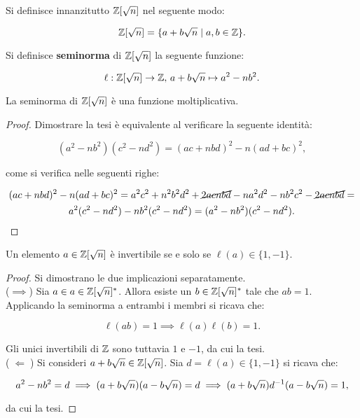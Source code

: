 \documentclass[11pt]{scrbook}
\begin{document}
Si definisce innanzitutto $\mathbb Z[\sqrt{n}]$ nel seguente modo:

\[ \mathbb Z[\sqrt{n}] = \{ a + b\sqrt{n} \mid a, b \in \mathbb Z \}. \]

\begin{definition}
    Si definisce \textbf{seminorma} di $\mathbb Z[\sqrt{n}]$ la seguente
    funzione:
    
    \[ \ell : \mathbb Z[\sqrt{n}] \to \mathbb Z, \, a + b\sqrt{n} \mapsto a^2 - n b^2. \]
\end{definition}

\begin{proposition}
    La seminorma di $\mathbb Z[\sqrt{n}]$ è una funzione moltiplicativa.
\end{proposition}

\begin{proof}
    Dimostrare la tesi è equivalente al verificare la seguente identità:
    
    \[ (a^2-nb^2)(c^2-nd^2)=(ac+nbd)^2-n(ad+bc)^2, \]
    
    \vskip 0.1in
    
    come si verifica nelle seguenti righe:
    
    \begin{multline*}
        (ac+nbd)^2-n(ad+bc)^2 = a^2c^2+n^2b^2d^2+\cancel{2acnbd}-na^2d^2-nb^2c^2-\cancel{2acnbd} = \\
        a^2(c^2-nd^2) -nb^2(c^2-nd^2) = (a^2-nb^2)(c^2-nd^2).
    \end{multline*}
\end{proof}

\begin{theorem}
    \label{th:invertibili_z_sqrtn}
    Un elemento $a \in \mathbb Z[\sqrt{n}]$ è invertibile se e solo se
    $\ell(a) \in \{1, -1\}$.
\end{theorem}

\begin{proof}
    Si dimostrano le due implicazioni separatamente. \\
    
    ($\implies$) \; Sia $a \in a \in \mathbb Z[\sqrt{n}]^*$. Allora esiste un
    $b \in \mathbb Z[\sqrt{n}]^*$ tale che $ab = 1$. Applicando la seminorma
    a entrambi i membri si ricava che:
    
    \[ \ell(ab) = 1 \implies \ell(a)\ell(b) = 1. \]
    
    \vskip 0.1in
    
    Gli unici invertibili di $\mathbb Z$ sono tuttavia $1$ e $-1$,
    da cui la tesi. \\
    
    ($\;\Longleftarrow\;$) \; Si consideri $a+b\sqrt{n} \in \mathbb Z[\sqrt{n}]$.
    Sia $d = \ell(a) \in \{1, -1\}$ si ricava che:
    
    \[ a^2-nb^2 = d \implies (a+b\sqrt{n})(a-b\sqrt{n})=d \implies (a+b\sqrt{n})d^{-1}(a-b\sqrt{n})=1, \]
    
    \vskip 0.1in
    
    da cui la tesi.
\end{proof}
\end{document}
